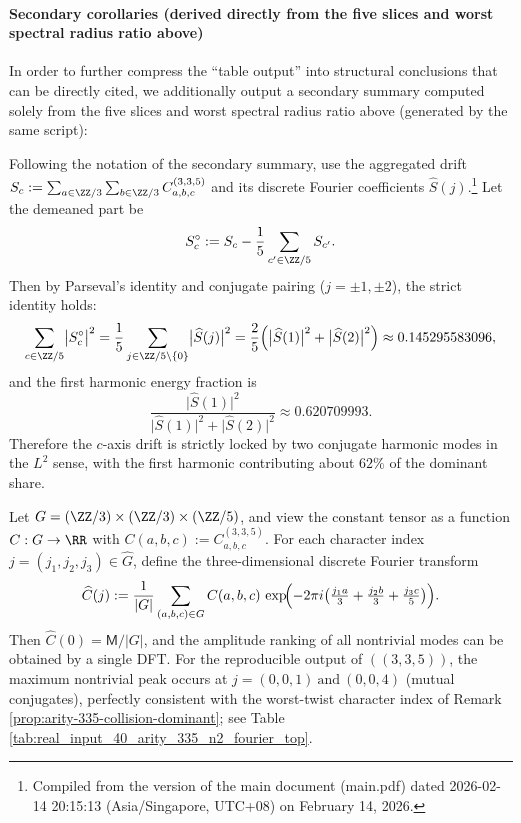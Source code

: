 \paragraph{Secondary corollaries (derived directly from the five slices and worst spectral radius ratio above)}
In order to further compress the ``table output'' into structural conclusions that can be directly cited, we additionally output a secondary summary computed solely from the five slices and worst spectral radius ratio above (generated by the same script):


\begin{remark}\label{rem:arity-335-collision-axis-bimodal-lock-parseval}
Following the notation of the secondary summary, use the aggregated drift
\(
S_c:=\sum_{a\in\ZZ/3}\sum_{b\in\ZZ/3}C^{(3,3,5)}_{a,b,c}
\)
and its discrete Fourier coefficients \(\widehat S(j)\).\footnote{Compiled from the version of the main document (main.pdf) dated 2026-02-14 20:15:13 (Asia/Singapore, UTC+08) on February 14, 2026.}
Let the demeaned part be
\[
S_c^\circ:=S_c-\frac{1}{5}\sum_{c'\in\ZZ/5}S_{c'}.
\]
Then by Parseval's identity and conjugate pairing (\(j=\pm1,\pm2\)), the strict identity holds:
\[
\sum_{c\in\ZZ/5}\bigl|S_c^\circ\bigr|^2
=\frac{1}{5}\sum_{j\in\ZZ/5\setminus\{0\}}\bigl|\widehat S(j)\bigr|^2
=\frac{2}{5}\Bigl(\bigl|\widehat S(1)\bigr|^2+\bigl|\widehat S(2)\bigr|^2\Bigr)
\approx 0.145295583096,
\]
and the first harmonic energy fraction is
\[
\frac{\bigl|\widehat S(1)\bigr|^2}{\bigl|\widehat S(1)\bigr|^2+\bigl|\widehat S(2)\bigr|^2}\approx 0.620709993.
\]
Therefore the \(c\)-axis drift is strictly locked by two conjugate harmonic modes in the \(L^2\) sense, with the first harmonic contributing about \(62\%\) of the dominant share.
\end{remark}

\begin{remark}\label{rem:arity-335-constant-tensor-3d-dft-worst}
Let \(G=(\ZZ/3)\times(\ZZ/3)\times(\ZZ/5)\), and view the constant tensor as a function \(C:G\to\RR\) with \(C(a,b,c):=C^{(3,3,5)}_{a,b,c}\).
For each character index \(j=(j_1,j_2,j_3)\in\widehat G\), define the three-dimensional discrete Fourier transform
\[
\widehat C(j)
:=\frac{1}{|G|}\sum_{(a,b,c)\in G} C(a,b,c)\,
\exp\!\Bigl(-2\pi i\bigl(\tfrac{j_1a}{3}+\tfrac{j_2b}{3}+\tfrac{j_3c}{5}\bigr)\Bigr).
\]
Then \(\widehat C(0)=\mathsf{M}/|G|\), and the amplitude ranking of all nontrivial modes can be obtained by a single DFT.
For the reproducible output of \(((3,3,5))\), the maximum nontrivial peak occurs at
\(
j=(0,0,1)\ \text{and}\ (0,0,4)
\)
(mutual conjugates), perfectly consistent with the worst-twist character index of Remark \ref{prop:arity-335-collision-dominant}; see Table \ref{tab:real_input_40_arity_335_n2_fourier_top}.
\end{remark}


